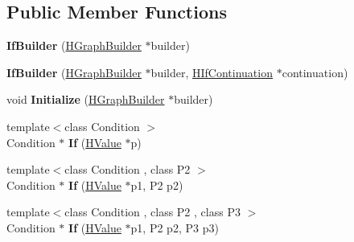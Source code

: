 \subsection*{Public Member Functions}
\begin{DoxyCompactItemize}
\item 
{\bfseries If\+Builder} (\hyperlink{classv8_1_1internal_1_1_h_graph_builder}{H\+Graph\+Builder} $\ast$builder)\hypertarget{classv8_1_1internal_1_1_h_graph_builder_1_1_if_builder_a1fe03a132b4b7d988f74a281f7a47baf}{}\label{classv8_1_1internal_1_1_h_graph_builder_1_1_if_builder_a1fe03a132b4b7d988f74a281f7a47baf}

\item 
{\bfseries If\+Builder} (\hyperlink{classv8_1_1internal_1_1_h_graph_builder}{H\+Graph\+Builder} $\ast$builder, \hyperlink{classv8_1_1internal_1_1_h_if_continuation}{H\+If\+Continuation} $\ast$continuation)\hypertarget{classv8_1_1internal_1_1_h_graph_builder_1_1_if_builder_ad88201755b91f3e5f917fe4d2f867211}{}\label{classv8_1_1internal_1_1_h_graph_builder_1_1_if_builder_ad88201755b91f3e5f917fe4d2f867211}

\item 
void {\bfseries Initialize} (\hyperlink{classv8_1_1internal_1_1_h_graph_builder}{H\+Graph\+Builder} $\ast$builder)\hypertarget{classv8_1_1internal_1_1_h_graph_builder_1_1_if_builder_a675b1ca6ed0f4e9bd040912a6a7c7334}{}\label{classv8_1_1internal_1_1_h_graph_builder_1_1_if_builder_a675b1ca6ed0f4e9bd040912a6a7c7334}

\item 
{\footnotesize template$<$class Condition $>$ }\\Condition $\ast$ {\bfseries If} (\hyperlink{classv8_1_1internal_1_1_h_value}{H\+Value} $\ast$p)\hypertarget{classv8_1_1internal_1_1_h_graph_builder_1_1_if_builder_ae2d8c0befaadbec7a081c3698786ad0d}{}\label{classv8_1_1internal_1_1_h_graph_builder_1_1_if_builder_ae2d8c0befaadbec7a081c3698786ad0d}

\item 
{\footnotesize template$<$class Condition , class P2 $>$ }\\Condition $\ast$ {\bfseries If} (\hyperlink{classv8_1_1internal_1_1_h_value}{H\+Value} $\ast$p1, P2 p2)\hypertarget{classv8_1_1internal_1_1_h_graph_builder_1_1_if_builder_a6e6de2d247d045853de6248bb4d02b1f}{}\label{classv8_1_1internal_1_1_h_graph_builder_1_1_if_builder_a6e6de2d247d045853de6248bb4d02b1f}

\item 
{\footnotesize template$<$class Condition , class P2 , class P3 $>$ }\\Condition $\ast$ {\bfseries If} (\hyperlink{classv8_1_1internal_1_1_h_value}{H\+Value} $\ast$p1, P2 p2, P3 p3)\hypertarget{classv8_1_1internal_1_1_h_graph_builder_1_1_if_builder_a48737b4d6caa710bca73dcd45c4b00a6}{}\label{classv8_1_1internal_1_1_h_graph_builder_1_1_if_builder_a48737b4d6caa710bca73dcd45c4b00a6}


\end{DoxyCompactItemize}
